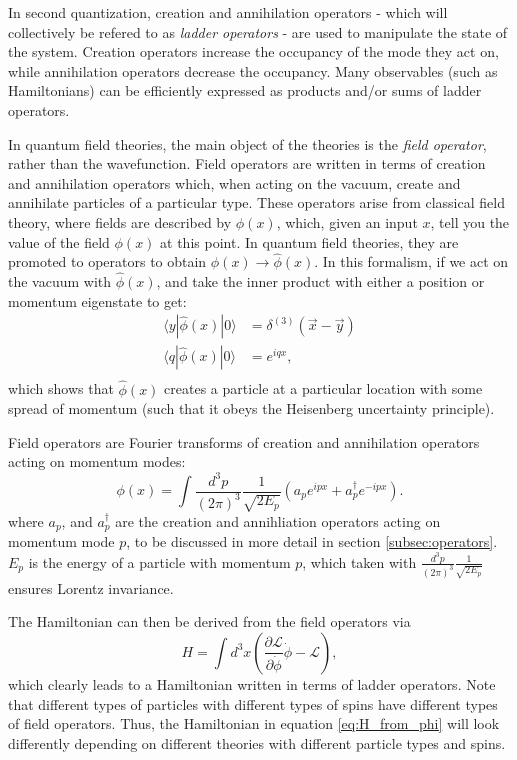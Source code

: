 In second quantization, creation and annihilation operators - which will collectively be refered to as \emph{ladder operators} - are used to manipulate the state of the system.
Creation operators increase the occupancy of the mode they act on, while annihilation operators decrease the occupancy.
Many observables (such as Hamiltonians) can be efficiently expressed as products and/or sums of ladder operators.  

In quantum field theories, the main object of the theories is the \textit{field operator}, rather than the wavefunction. Field operators are written in terms of creation and annihilation operators which, when acting on the vacuum, create and annihilate particles of a particular type. 
These operators arise from classical field theory, where fields are described by $\phi(x)$, which, given an input $x$, tell you the value of the field $\phi(x)$  at this point. In quantum field theories, they are promoted to operators to obtain $\phi(x) \rightarrow \hat{\phi}(x)$.
In this formalism, if we act on the vacuum with $\hat{\phi}(x)$, and take the inner product with either a position or momentum eigenstate to get:
\begin{align}
    \langle y|\hat{\phi}(x)|0\rangle &= \delta^{(3)}(\vec{x} - \vec{y}) \\ \nonumber
    \langle q|\hat{\phi}(x)|0\rangle &= e^{iqx}, \\
\end{align}
which shows that $\hat{\phi}(x)$ creates a particle at a particular location with some spread of momentum (such that it obeys the Heisenberg uncertainty principle).

Field operators are Fourier transforms of creation and annihilation operators acting on momentum modes: 
\begin{equation}
    \phi(x) = \int \frac{d^3p}{(2\pi)^3}\frac{1}{\sqrt{2E_p}}\left(a_p e^{ipx} + a_p^\dagger e^{-ipx}\right).
\end{equation}
where $a_p$, and $a_p^\dagger$ are the creation and annihliation operators acting on momentum mode $p$, to be discussed in more detail in section \ref{subsec:operators}. $E_p$ is the energy of a particle with momentum $p$, which taken with $\frac{d^3p}{(2\pi)^3}\frac{1}{\sqrt{2E_p}}$ ensures Lorentz invariance. 

The Hamiltonian can then be derived from the field operators via 
\begin{equation}
    \label{eq:H_from_phi}
    H = \int d^3x \left(\frac{\partial \mathcal{L}}{\partial \dot{\phi}}\dot{\phi} - \mathcal{L} \right),
\end{equation}
which clearly leads to a Hamiltonian written in terms of ladder operators. Note that different types of particles with different types of spins have different types of field operators. Thus, the Hamiltonian in equation \ref{eq:H_from_phi} will look differently depending on different theories with different particle types and spins. 

